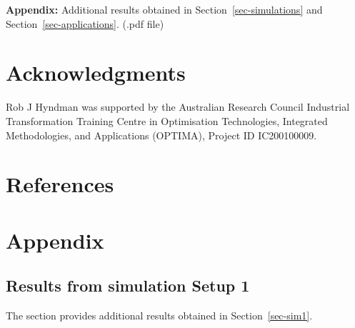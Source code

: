\documentclass[
  11pt]{article}
\theoremstyle{plain}
\theoremstyle{remark}
\begin{document}
\textbf{Appendix:} Additional results obtained in
Section~\ref{sec-simulations} and Section~\ref{sec-applications}. (.pdf
file)

\section*{Acknowledgments}\label{acknowledgments}

Rob J Hyndman was supported by the Australian Research Council
Industrial Transformation Training Centre in Optimisation Technologies,
Integrated Methodologies, and Applications (OPTIMA), Project ID
IC200100009.

\section*{References}\label{references}

\renewcommand{\bibsection}{}


\newpage
\appendix
{}%
\setcounter{section}{0}
\renewcommand{\thesubsection}{\Alph{subsection}}
\renewcommand{\thetable}{\Alph{subsection}.\arabic{table}}
\renewcommand{\thefigure}{\Alph{subsection}.\arabic{figure}}
\setcounter{figure}{0}
\setcounter{table}{0}

\section*{Appendix}\label{appendix}

\subsection{Results from simulation Setup
1}\label{results-from-simulation-setup-1}

The section provides additional results obtained in
Section~\ref{sec-sim1}.
\end{document}

